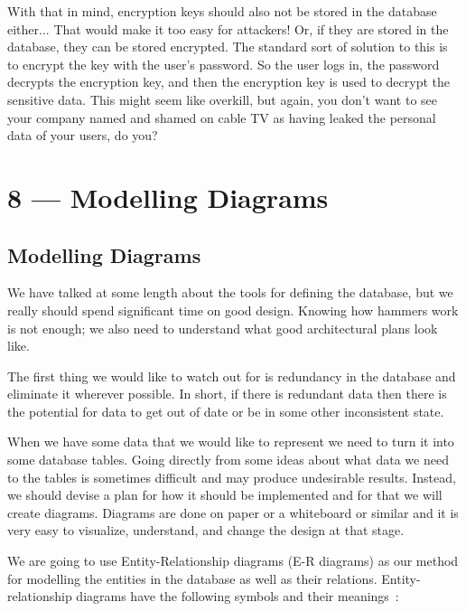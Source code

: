 \documentclass[a4paper]{report}
\begin{document}
With that in mind, encryption keys should also not be stored in the database either... That would make it too easy for attackers! Or, if they are stored in the database, they can be stored encrypted. The standard sort of solution to this is to encrypt the key with the user's password. So the user logs in, the password decrypts the encryption key, and then the encryption key is used to decrypt the sensitive data. This might seem like overkill, but again, you don't want to see your company named and shamed on cable TV as having leaked the personal data of your users, do you?









\chapter*{8 --- Modelling Diagrams}


\section*{Modelling Diagrams}

We have talked at some length about the tools for defining the database, but we really should spend significant time on good design. Knowing how hammers work is not enough; we also need to understand what good architectural plans look like.

The first thing we would like to watch out for is redundancy in the database and eliminate it wherever possible. In short, if there is redundant data then there is the potential for data to get out of date or be in some other inconsistent state. 

When we have some data that we would like to represent we need to turn it into some database tables. Going directly from some ideas about what data we need to the tables is sometimes difficult and may produce undesirable results. Instead, we should devise a plan for how it should be implemented and for that we will create diagrams. Diagrams are done on paper or a whiteboard or similar and it is very easy to visualize, understand, and change the design at that stage.

We are going to use Entity-Relationship diagrams (E-R diagrams) as our method for modelling the entities in the database as well as their relations. Entity-relationship diagrams have the following symbols and their meanings~\cite{dsc}:
\end{document}
